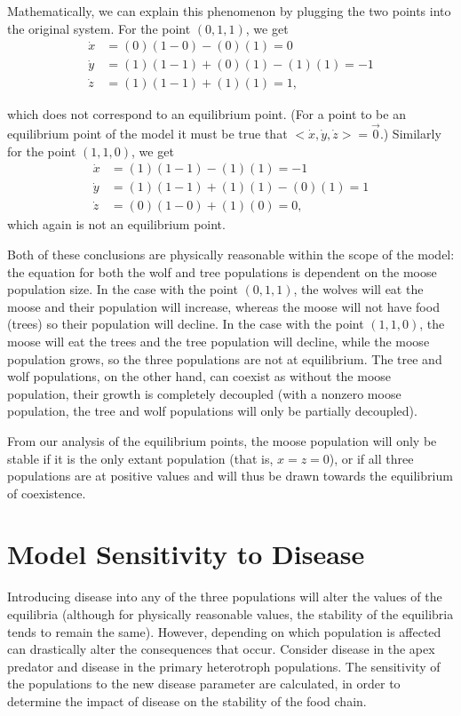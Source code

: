 \documentclass[10pt]{article}
\begin{document}
Mathematically, we can explain this phenomenon by plugging the two points into the original system. For the point \((0,1,1)\), we get
\begin{align*}
\dot{x} &= (0)(1-0)-(0)(1) = 0\\
\dot{y} &= (1)(1-1)+(0)(1)-(1)(1) = -1 \\
\dot{z} &= (1)(1-1)+(1)(1) = 1,
\end{align*}

which does not correspond to an equilibrium point. (For a point to be an equilibrium point of the model it must be true that \(<\dot{x},\dot{y},\dot{z}> = \vec{0}\).) Similarly for the point \((1,1,0)\), we get 
\begin{align*}
\dot{x} &= (1)(1-1)-(1)(1) = -1\\
\dot{y} &= (1)(1-1)+(1)(1)-(0)(1) = 1 \\
\dot{z} &= (0)(1-0)+(1)(0) = 0,
\end{align*}
which again is not an equilibrium point.

Both of these conclusions are physically reasonable within the scope of the model: the equation for both the wolf and tree populations is dependent on the moose population size. In the case with the point \((0,1,1)\), the wolves will eat the moose and their population will increase, whereas the moose will not have food (trees) so their population will decline. In the case with the point \((1,1,0)\), the moose will eat the trees and the tree population will decline, while the moose population grows, so the three populations are not at equilibrium. The tree and wolf populations, on the other hand, can coexist as without the moose population, their growth is completely decoupled (with a nonzero moose population, the tree and wolf populations will only be partially decoupled).

From our analysis of the equilibrium points, the moose population will only be stable if it is the only extant population (that is, \(x=z=0\)), or if all three populations are at positive values and will thus be drawn towards the equilibrium of coexistence. 

\section{Model Sensitivity to Disease}

Introducing disease into any of the three populations will alter the values of the equilibria (although for physically reasonable values, the stability of the equilibria tends to remain the same). However, depending on which population is affected can drastically alter the consequences that occur. Consider disease in the apex predator and disease in the primary heterotroph populations. The sensitivity of the populations to the new disease parameter are calculated, in order to determine the impact of disease on the stability of the food chain.
\end{document}
